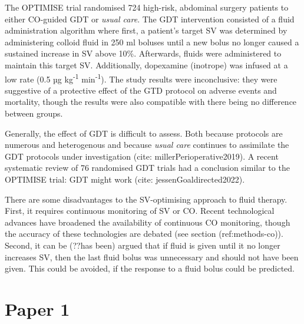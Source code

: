 \documentclass[a4paper, nobind]{templates/ociamthesis}
\begin{document}
The OPTIMISE trial randomised 724 high-risk, abdominal surgery patients to either CO-guided GDT or \emph{usual care}. The GDT intervention consisted of a fluid administration algorithm where first, a patient's target SV was determined by administering colloid fluid in 250 ml boluses until a new bolus no longer caused a sustained increase in SV above 10\%. Afterwards, fluids were administered to maintain this target SV. Additionally, dopexamine (inotrope) was infused at a low rate (0.5 µg kg\textsuperscript{-1} min\textsuperscript{-1}). The study results were inconclusive: they were suggestive of a protective effect of the GTD protocol on adverse events and mortality, though the results were also compatible with there being no difference between groups.

Generally, the effect of GDT is difficult to assess. Both because protocols are numerous and heterogenous and because \emph{usual care} continues to assimilate the GDT protocols under investigation (cite: millerPerioperative2019). A recent systematic review of 76 randomised GDT trials had a conclusion similar to the OPTIMISE trial: GDT might work (cite: jessenGoaldirected2022).

There are some disadvantages to the SV-optimising approach to fluid therapy. First, it requires continuous monitoring of SV or CO. Recent technological advances have broadened the availability of continuous CO monitoring, though the accuracy of these technologies are debated (see section (ref:methods-co)). Second, it can be (??has been) argued that if fluid is given until it no longer increases SV, then the last fluid bolus was unnecessary and should not have been given. This could be avoided, if the response to a fluid bolus could be predicted.

\startappendices

\hypertarget{paper-1}{%
\chapter{Paper 1}\label{paper-1}}
\end{document}
